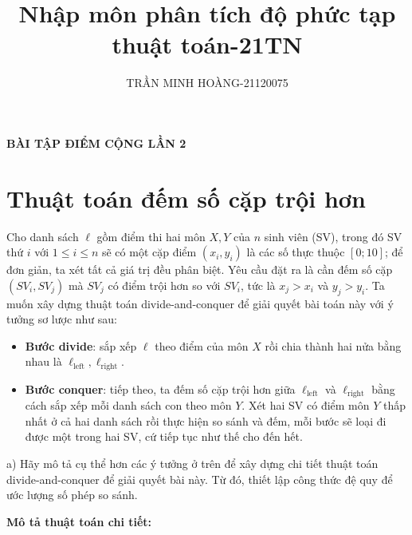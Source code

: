 \documentclass[12pt,a4paper]{article}
\title{\LARGE{\textbf{Nhập môn phân tích độ phức tạp thuật toán-21TN}}}
\author{TRẦN MINH HOÀNG-21120075}
\date{} %
\begin{document}
\maketitle
\begin{center}
    \textbf{BÀI TẬP ĐIỂM CỘNG LẦN 2}
\end{center}
\section*{Thuật toán đếm số cặp trội hơn}

Cho danh sách \( \ell \) gồm điểm thi hai môn \( X, Y \) của \( n \) sinh viên (SV), trong đó SV thứ \( i \) với \( 1 \leq i \leq n \) sẽ có một cặp điểm \( (x_i, y_i) \) là các số thực thuộc \([0; 10]\); để đơn giản, ta xét tất cả giá trị đều phân biệt. Yêu cầu đặt ra là cần đếm số cặp \((SV_i, SV_j)\) mà \( SV_j \) có điểm trội hơn so với \( SV_i \), tức là \( x_j > x_i \) và \( y_j > y_i \). Ta muốn xây dựng thuật toán divide-and-conquer để giải quyết bài toán này với ý tưởng sơ lược như sau:

\begin{itemize}
    \item \textbf{Bước divide}: sắp xếp \( \ell \) theo điểm của môn \( X \) rồi chia thành hai nửa bằng nhau là \( \ell_{\text{left}}, \ell_{\text{right}} \).
    \item \textbf{Bước conquer}: tiếp theo, ta đếm số cặp trội hơn giữa \( \ell_{\text{left}} \) và \( \ell_{\text{right}} \) bằng cách sắp xếp mỗi danh sách con theo môn \( Y \). Xét hai SV có điểm môn \( Y \) thấp nhất ở cả hai danh sách rồi thực hiện so sánh và đếm, mỗi bước sẽ loại đi được một trong hai SV, cứ tiếp tục như thế cho đến hết.
\end{itemize}

a) Hãy mô tả cụ thể hơn các ý tưởng ở trên để xây dựng chi tiết thuật toán divide-and-conquer để giải quyết bài này. Từ đó, thiết lập công thức đệ quy để ước lượng số phép so sánh.

\textbf{Mô tả thuật toán chi tiết:}
\end{document}
